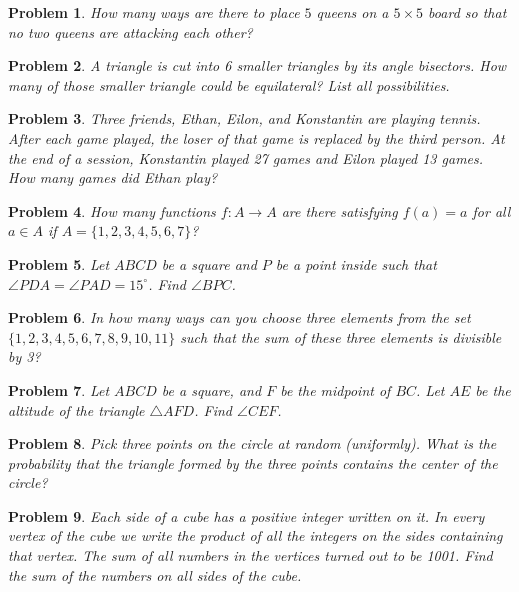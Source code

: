 \documentclass[a4paper,12pt]{article}
\theoremstyle{perfect}
\newtheorem{prb}{Problem}
\begin{document}
\begin{prb}
How many ways are there to place $5$ queens on a $5 \times 5$ board so that no two queens are attacking each other?
\end{prb}

\begin{prb}
A triangle is cut into 6 smaller triangles by its angle bisectors. How many of those smaller triangle could be equilateral? List all possibilities. 
\end{prb}

\begin{prb}
Three friends, Ethan, Eilon, and Konstantin are playing tennis. After each game played, the loser of that game is replaced by the third person. At the end of a session, Konstantin played 27 games and Eilon played 13 games. How many games did Ethan play?
\end{prb}

\begin{prb}
How many functions $f : A \to A$ are there satisfying $f(a) = a$ for all $a \in A$ if $A = \{1,2,3,4,5,6,7\}$?
\end{prb} 


\begin{prb}
Let $ABCD$ be a square and $P$ be a point inside such that $\angle PDA = \angle PAD = 15^\circ$. Find $\angle BPC$.
\end{prb}


\begin{prb}
In how many ways can you choose three elements from the set $\{1,2,3,4,5,6,7,8,9,10,11\}$ such that the sum of these three elements is divisible by 3?
\end{prb}

\begin{prb}
Let $ABCD$ be a square, and $F$ be the midpoint of $BC$. Let $AE$ be the altitude of the triangle $\triangle AFD$. Find $\angle CEF$.
\end{prb} 

\begin{prb}
Pick three points on the circle at random (uniformly). What is the probability that the triangle formed by the three points contains the center of the circle?
\end{prb}

\begin{prb}
Each side of a cube has a positive integer written on it. In every vertex of the cube we write the product of all the integers on the sides containing that vertex. The sum of all numbers in the vertices turned out to be 1001. Find the sum of the numbers on all sides of the cube.
\end{prb} 
\end{document}
